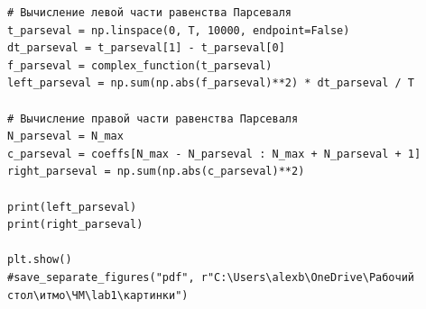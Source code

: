 \documentclass[a4paper, 12pt]{article}
\begin{document}
\begin{verbatim}
# Вычисление левой части равенства Парсеваля
t_parseval = np.linspace(0, T, 10000, endpoint=False)
dt_parseval = t_parseval[1] - t_parseval[0]
f_parseval = complex_function(t_parseval)
left_parseval = np.sum(np.abs(f_parseval)**2) * dt_parseval / T

# Вычисление правой части равенства Парсеваля
N_parseval = N_max
c_parseval = coeffs[N_max - N_parseval : N_max + N_parseval + 1]
right_parseval = np.sum(np.abs(c_parseval)**2)

print(left_parseval)
print(right_parseval)

plt.show()
#save_separate_figures("pdf", r"C:\Users\alexb\OneDrive\Рабочий стол\итмо\ЧМ\lab1\картинки")
\end{verbatim}
\label{app:task2}
\end{document}
